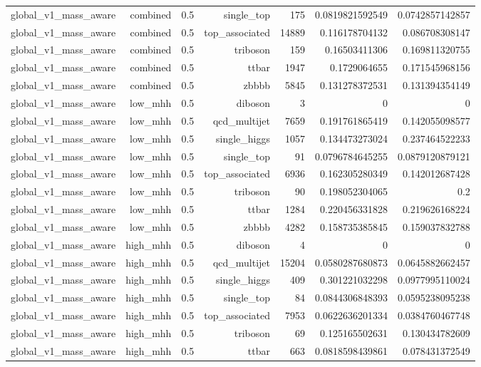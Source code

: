 \begin{table}[htbp]
{\begin{tabular}{lrrrrrr}
global\_v1\_mass\_aware & combined & 0.5 & single\_top & 175 & 0.0819821592549 & 0.0742857142857 \\
global\_v1\_mass\_aware & combined & 0.5 & top\_associated & 14889 & 0.116178704132 & 0.086708308147 \\
global\_v1\_mass\_aware & combined & 0.5 & triboson & 159 & 0.16503411306 & 0.169811320755 \\
global\_v1\_mass\_aware & combined & 0.5 & ttbar & 1947 & 0.1729064655 & 0.171545968156 \\
global\_v1\_mass\_aware & combined & 0.5 & zbbbb & 5845 & 0.131278372531 & 0.131394354149 \\
global\_v1\_mass\_aware & low\_mhh & 0.5 & diboson & 3 & 0 & 0 \\
global\_v1\_mass\_aware & low\_mhh & 0.5 & qcd\_multijet & 7659 & 0.191761865419 & 0.142055098577 \\
global\_v1\_mass\_aware & low\_mhh & 0.5 & single\_higgs & 1057 & 0.134473273024 & 0.237464522233 \\
global\_v1\_mass\_aware & low\_mhh & 0.5 & single\_top & 91 & 0.0796784645255 & 0.0879120879121 \\
global\_v1\_mass\_aware & low\_mhh & 0.5 & top\_associated & 6936 & 0.162305280349 & 0.142012687428 \\
global\_v1\_mass\_aware & low\_mhh & 0.5 & triboson & 90 & 0.198052304065 & 0.2 \\
global\_v1\_mass\_aware & low\_mhh & 0.5 & ttbar & 1284 & 0.220456331828 & 0.219626168224 \\
global\_v1\_mass\_aware & low\_mhh & 0.5 & zbbbb & 4282 & 0.158735385845 & 0.159037832788 \\
global\_v1\_mass\_aware & high\_mhh & 0.5 & diboson & 4 & 0 & 0 \\
global\_v1\_mass\_aware & high\_mhh & 0.5 & qcd\_multijet & 15204 & 0.0580287680873 & 0.0645882662457 \\
global\_v1\_mass\_aware & high\_mhh & 0.5 & single\_higgs & 409 & 0.301221032298 & 0.0977995110024 \\
global\_v1\_mass\_aware & high\_mhh & 0.5 & single\_top & 84 & 0.0844306848393 & 0.0595238095238 \\
global\_v1\_mass\_aware & high\_mhh & 0.5 & top\_associated & 7953 & 0.0622636201334 & 0.0384760467748 \\
global\_v1\_mass\_aware & high\_mhh & 0.5 & triboson & 69 & 0.125165502631 & 0.130434782609 \\
global\_v1\_mass\_aware & high\_mhh & 0.5 & ttbar & 663 & 0.0818598439861 & 0.078431372549 \\

\end{tabular}}
\end{table}
